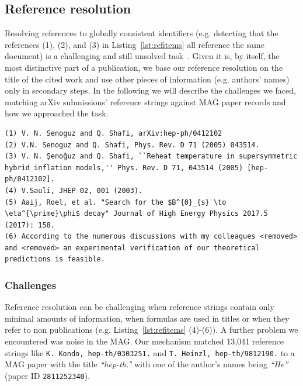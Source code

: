 \subsection{Reference resolution}\label{sec:refresol}
Resolving references to globally consistent identifiers (e.g. detecting that the references (1), (2), and (3) in Listing~\ref{lst:refitems} all reference the same document) is a challenging and still unsolved task~\cite{Nasar2018}. Given it is, by itself, the most distinctive part of a publication, we base our reference resolution on the title of the cited work and use other pieces of information (e.g. authors' names) only in secondary steps. In the following we will describe the challenges we faced, matching arXiv submissions' reference strings against MAG paper records and how we approached the task.

\begin{lstlisting}[caption={Examples of reference strings.},label={lst:refitems}]
(1) V. N. Senoguz and Q. Shafi, arXiv:hep-ph/0412102
(2) V.N. Senoguz and Q. Shafi, Phys. Rev. D 71 (2005) 043514.
(3) V. N. Şenoğuz and Q. Shafi, ``Reheat temperature in supersymmetric hybrid inflation models,'' Phys. Rev. D 71, 043514 (2005) [hep-ph/0412102].
(4) V.Sauli, JHEP 02, 001 (2003).
(5) Aaij, Roel, et al. "Search for the $B^{0}_{s} \to \eta^{\prime}\phi$ decay" Journal of High Energy Physics 2017.5 (2017): 158.
(6) According to the numerous discussions with my colleagues <removed> and <removed> an experimental verification of our theoretical predictions is feasible.
\end{lstlisting} %

\subsubsection{Challenges}
Reference resolution can be challenging when reference strings contain only minimal amounts of information, when formulas are used in titles or when they refer to non publications (e.g. Listing~\ref{lst:refitems} (4)-(6)). A further problem we encountered was noise in the MAG. Our mechanism matched 13,041 reference strings like \texttt{K. Kondo, hep-th/0303251.} and \texttt{T. Heinzl, hep-th/9812190.} to a MAG paper with the title \textit{``hep-th.''} with one of the author's names being \textit{``He''} (paper ID \texttt{2811252340}).

